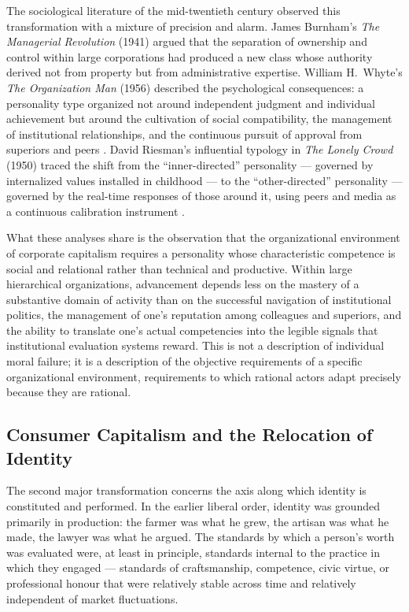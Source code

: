 \documentclass[12pt]{memoir}
\begin{document}
The sociological literature of the mid-twentieth century observed this transformation
with a mixture of precision and alarm. James Burnham's \textit{The Managerial Revolution}
(1941) argued that the separation of ownership and control within large corporations had
produced a new class whose authority derived not from property but from administrative
expertise. William H.\ Whyte's \textit{The Organization Man} (1956) described the
psychological consequences: a personality type organized not around independent judgment
and individual achievement but around the cultivation of social compatibility, the
management of institutional relationships, and the continuous pursuit of approval from
superiors and peers \citep{whyte1956organization}. David Riesman's influential typology
in \textit{The Lonely Crowd} (1950) traced the shift from the \enquote{inner-directed}
personality — governed by internalized values installed in childhood — to the
\enquote{other-directed} personality — governed by the real-time responses of those
around it, using peers and media as a continuous calibration instrument
\citep{riesman1950lonely}.

What these analyses share is the observation that the organizational environment of
corporate capitalism requires a personality whose characteristic competence is social
and relational rather than technical and productive. Within large hierarchical
organizations, advancement depends less on the mastery of a substantive domain of
activity than on the successful navigation of institutional politics, the management of
one's reputation among colleagues and superiors, and the ability to translate one's
actual competencies into the legible signals that institutional evaluation systems reward.
This is not a description of individual moral failure; it is a description of the
objective requirements of a specific organizational environment, requirements to which
rational actors adapt precisely because they are rational.

\subsection{Consumer Capitalism and the Relocation of Identity}

The second major transformation concerns the axis along which identity is constituted
and performed. In the earlier liberal order, identity was grounded primarily in
production: the farmer was what he grew, the artisan was what he made, the lawyer was
what he argued. The standards by which a person's worth was evaluated were, at least in
principle, standards internal to the practice in which they engaged — standards of
craftsmanship, competence, civic virtue, or professional honour that were relatively
stable across time and relatively independent of market fluctuations.
\end{document}
